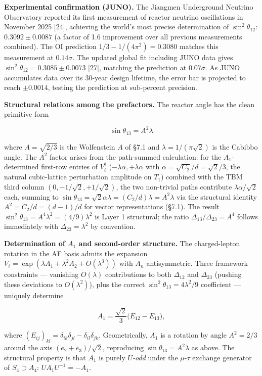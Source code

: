 \documentclass[
]{article}
\begin{document}
\textbf{Experimental confirmation (JUNO).} The Jiangmen Underground
Neutrino Observatory reported its first measurement of reactor neutrino
oscillations in November 2025 {[}24{]}, achieving the world's most
precise determination of \(\sin^2\theta_{12}\): \(0.3092 \pm 0.0087\) (a
factor of 1.6 improvement over all previous measurements combined). The
OI prediction \(1/3 - 1/(4\pi^2) = 0.3080\) matches this measurement at
\(0.14\sigma\). The updated global fit including JUNO data gives
\(\sin^2\theta_{12} = 0.3085 \pm 0.0073\) {[}27{]}, matching the
prediction at \(0.07\sigma\). As JUNO accumulates data over its 30-year
design lifetime, the error bar is projected to reach \(\pm 0.0014\),
testing the prediction at sub-percent precision.

\textbf{Structural relations among the prefactors.} The reactor angle
has the clean primitive form

\[\sin\theta_{13} = A^2 \lambda\]

where \(A = \sqrt{2/3}\) is the Wolfenstein \(A\) of §7.1 and
\(\lambda = 1/(\pi\sqrt{2})\) is the Cabibbo angle. The \(A^2\) factor
arises from the path-summed calculation: for the \(A_1\)-determined
first-row entries of \(V_\ell^\dagger\)
(\(-\lambda\alpha, +\lambda\alpha\) with
\(\alpha = \sqrt{C_2}/d = \sqrt 2/3\), the natural cubic-lattice
perturbation amplitude on \(T_1\)) combined with the TBM third column
\((0, -1/\sqrt 2, +1/\sqrt 2)\), the two non-trivial paths contribute
\(\lambda\alpha/\sqrt 2\) each, summing to
\(\sin\theta_{13} = \sqrt{2}\alpha\lambda = (C_2/d)\lambda = A^2 \lambda\)
via the structural identity \(A^2 = C_2/d = (d-1)/d\) for vector
representations (§7.1). The result
\(\sin^2\theta_{13} = A^4\lambda^2 = (4/9)\lambda^2\) is Layer 1
structural; the ratio \(\Delta_{13}/\Delta_{23} = A^4\) follows
immediately with \(\Delta_{23} = \lambda^2\) by convention.

\textbf{Determination of \(A_1\) and second-order structure.} The
charged-lepton rotation in the AF basis admits the expansion
\(V_\ell = \exp(\lambda A_1 + \lambda^2 A_2 + O(\lambda^3))\) with
\(A_n\) antisymmetric. Three framework constraints --- vanishing
\(O(\lambda)\) contributions to both \(\Delta_{12}\) and \(\Delta_{23}\)
(pushing these deviations to \(O(\lambda^2)\)), plus the correct
\(\sin^2\theta_{13} = 4\lambda^2/9\) coefficient --- uniquely determine

\[A_1 = \frac{\sqrt{2}}{3}\big(E_{12} - E_{13}\big),\]

where
\((E_{ij})_{kl} = \delta_{ik}\delta_{jl} - \delta_{il}\delta_{jk}\).
Geometrically, \(A_1\) is a rotation by angle \(A^2 = 2/3\) around the
axis \((e_2 + e_3)/\sqrt{2}\), reproducing
\(\sin\theta_{13} = A^2\lambda\) as above. The structural property is
that \(A_1\) is purely \emph{\(U\)-odd} under the \(\mu\)-\(\tau\)
exchange generator of \(S_4 \supset A_4\): \(U A_1 U^{-1} = -A_1\).
\end{document}
